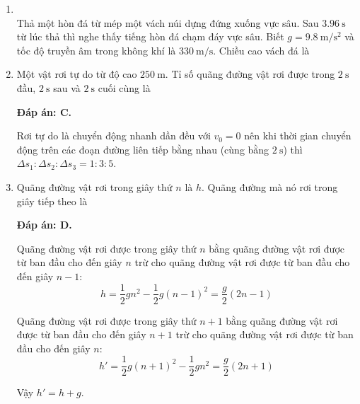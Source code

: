 \begin{enumerate}[label=\bfseries Câu \arabic*:,leftmargin=1.5cm]
	\item {}\\
	Thả một hòn đá từ mép một vách núi dựng đứng xuống vực sâu. Sau $\SI{3.96}{\second}$ từ lúc thả thì nghe thấy tiếng hòn đá chạm đáy vực sâu. Biết $g=\SI{9.8}{\meter/\second^2}$ và tốc độ truyền âm trong không khí là $\SI{330}{\meter/\second}$. Chiều cao vách đá là
	\begin{mcq}(4)
		\item $\SI{76}{\meter}$.
		\item $\SI{58}{\meter}$.
		\item $\SI{69}{\meter}$.
		\item $\SI{82}{\meter}$.
	\end{mcq}
	
	\item {}
	
	
	{Một vật rơi tự do từ độ cao $250\ \text{m}$. Tỉ số quãng đường vật rơi được trong $2\ \text{s}$ đầu, $2\ \text{s}$ sau và $2\ \text{s}$ cuối cùng là
	}
	\hideall
	{	\textbf{Đáp án: C.}
		
		Rơi tự do là chuyển động nhanh dần đều với $v_0=0$  nên khi thời gian chuyển động trên các đoạn đường liên tiếp bằng nhau (cùng bằng $2\ \text{s}$) thì $\Delta s_1:\Delta s_2:\Delta s_3=1:3:5$.
	}

	
	\item {}
	
	
	{Quãng đường vật rơi trong giây thứ $n$ là $h$. Quãng đường mà nó rơi trong giây tiếp theo là
		
		
	}
	\hideall
	{	\textbf{Đáp án: D.}
		
		Quãng đường vật rơi được trong giây thứ $n$ bằng quãng đường vật rơi được từ ban đầu cho đến giây $n$ trừ cho quãng đường vật rơi được từ ban đầu cho đến giây $n-1$: $$h=\dfrac{1}{2}gn^2-\dfrac{1}{2}g(n-1)^2=\dfrac{g}{2}(2n-1)$$
		
		Quãng đường vật rơi được trong giây thứ $n+1$ bằng quãng đường vật rơi được từ ban đầu cho đến giây $n+1$ trừ cho quãng đường vật rơi được từ ban đầu cho đến giây $n$:
		$$h'=\dfrac{1}{2}g(n+1)^2-\dfrac{1}{2}gn^2 = \dfrac{g}{2}(2n+1)$$
		
		Vậy $h'=h+g$.
	}
\end{enumerate}

